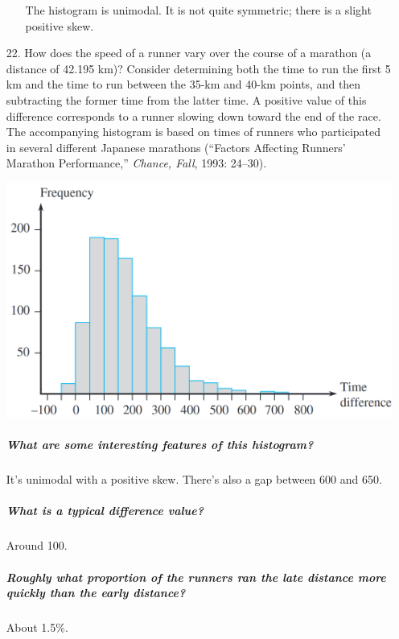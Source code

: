 \documentclass[letterpaper,12pt]{article}
\begin{document}
\begin{enumerate}
\begin{enumerate}
        The histogram is unimodal. It is not quite symmetric; there is a slight positive skew.
    \end{enumerate}
  \item[22.]
    How does the speed of a runner vary over the course of a marathon (a distance of 42.195 km)? Consider determining both the time to run the first 5 km and the time to run between the 35-km and 40-km points, and then subtracting the former time from the latter time. A positive value of this difference corresponds to a runner slowing down toward the end of the race. The accompanying histogram is based on times of runners who participated in several different Japanese marathons (``Factors Affecting Runners’ Marathon Performance,'' \textit{Chance, Fall}, 1993: 24–30).
    \begin{center}
      \includegraphics[scale=0.3]{../resources/01_02_22_01.png}
    \end{center}
    \subparagraph{What are some interesting features of this histogram?}
    It's unimodal with a positive skew. There's also a gap between 600 and 650.
    \subparagraph{What is a typical difference value?}
    Around 100.
    \subparagraph{Roughly what proportion of the runners ran the late distance more quickly than the early distance?}
    About 1.5\%.
\end{enumerate}
\end{document}
